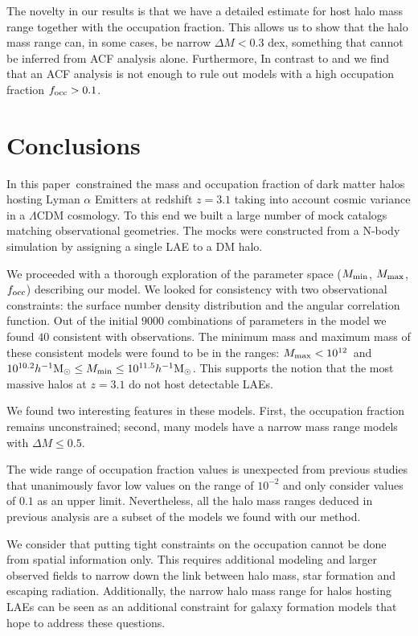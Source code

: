 \documentclass{emulateapj}
\newcommand{\documentname}{paper~}
\newcommand{\ly}{{\ifmmode{{\rm Ly}\alpha}\else{Ly$\alpha$~}\fi}}
\newcommand{\hMsun}{{\ifmmode{h^{-1}{\rm
        {M_{\odot}}}}\else{$h^{-1}{\rm{M_{\odot}}}$}\fi}}
\begin{document}
The novelty in our results is that we have a detailed estimate for 
host halo mass range together with the occupation fraction. This allows us
to show that the halo mass range can, in some cases, be narrow $\Delta M <
0.3$ dex, something that cannot be inferred from ACF analysis alone.
Furthermore, In contrast to \cite{Gawiser07} and \cite{Ouchi2010} we
find that an ACF analysis is not enough to rule out models with a high
occupation fraction $f_{\rm occ}>0.1$. 

\section{Conclusions}
\label{sec:conclusions}

In this \documentname constrained the  mass and occupation fraction of dark matter halos
hosting Lyman $\alpha$ Emitters at redshift $z=3.1$ taking into
account cosmic variance in a $\Lambda$CDM cosmology.  To this end we built a large number of mock catalogs
matching observational geometries. The mocks were constructed from a
N-body simulation by assigning a single LAE to a DM halo.
 
We proceeded with a thorough exploration of the parameter space
($M_{\rm min}$, $M_{\rm max}$, $f_{\rm occ}$) describing our
model. We looked for consistency with two observational constraints: the
surface number density distribution and the angular correlation
function. Out of the initial $9000$  combinations of parameters in the
model we found $40$ consistent with observations.  The minimum mass and
maximum mass of these consistent models were found to be in the
ranges:   $M_{\rm  max}<10^{12}$\hMsun\ and $10^{10.2}\hMsun\leq
M_{\rm min}\leq 10^{11.5}\hMsun$.  This supports the notion that the
most massive halos at $z=3.1$ do not host detectable LAEs.  

We found two interesting features in these models. First, the
occupation fraction remains unconstrained; second, many models have a
narrow mass range models with $\Delta M \leq 0.5$.   
 
The wide range of occupation fraction values is unexpected from
previous studies \citep[i.e.][]{Gawiser2007,Ouchi2010}  that
unanimously favor low values on the range of $10^{-2}$ and only
consider values of $0.1$ as an upper limit. Nevertheless, all the halo
mass ranges deduced in previous analysis are a subset of the models we
found with our method. 

We consider that putting tight constraints on the occupation cannot be
done from spatial information only. This requires additional modeling and
larger observed fields to narrow down the link between halo mass, star
formation and escaping \ly radiation. Additionally, the narrow halo
mass range for halos hosting LAEs can be seen as an additional
constraint for galaxy formation models that hope to address these
questions. 
\end{document}
